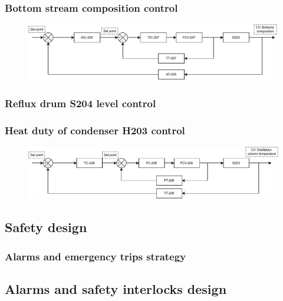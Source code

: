 \subsubsection{Bottom stream composition control}
\begin{figure}[H]
    \centering
    \includegraphics[width=\linewidth]{chapters/4-operation-control/4-Figures/S203-CC.pdf}
    \caption{}
    \label{fig:S203-CC}
\end{figure}

\subsubsection{Reflux drum S204 level control}

\subsubsection{Heat duty of condenser H203 control}
\begin{figure}[H]
    \centering
    \includegraphics[width=\linewidth]{chapters/4-operation-control/4-Figures/S203C-TC.pdf}
    \caption{}
    \label{fig:S203C-TC}
\end{figure}


\subsubsection{}

\subsection{Safety design}

\subsubsection{Alarms and emergency trips strategy}

\subsection{Alarms and safety interlocks design}